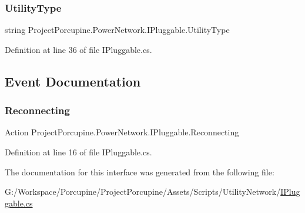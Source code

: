 \subsubsection{\texorpdfstring{Utility\+Type}{UtilityType}}
{\footnotesize\ttfamily string Project\+Porcupine.\+Power\+Network.\+I\+Pluggable.\+Utility\+Type\hspace{0.3cm}{\ttfamily [get]}}



Definition at line 36 of file I\+Pluggable.\+cs.



\subsection{Event Documentation}
\mbox{\label{interface_project_porcupine_1_1_power_network_1_1_i_pluggable_a33495abbf6449fa7f0dfef592160eebd}} 
\subsubsection{\texorpdfstring{Reconnecting}{Reconnecting}}
{\footnotesize\ttfamily Action Project\+Porcupine.\+Power\+Network.\+I\+Pluggable.\+Reconnecting}



Definition at line 16 of file I\+Pluggable.\+cs.



The documentation for this interface was generated from the following file\+:\begin{DoxyCompactItemize}
\item 
G\+:/\+Workspace/\+Porcupine/\+Project\+Porcupine/\+Assets/\+Scripts/\+Utility\+Network/\hyperlink{_i_pluggable_8cs}{I\+Pluggable.\+cs}\end{DoxyCompactItemize}
